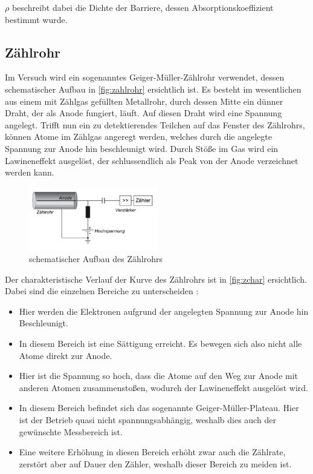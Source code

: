 \documentclass[12pt,english,ngerman]{scrartcl}
\begin{document}
$\rho$ beschreibt dabei die Dichte der Barriere, dessen Absorptionskoeffizient bestimmt wurde.\cite[]{}


\subsection{Zählrohr}

Im Versuch wird ein sogenanntes Geiger-Müller-Zählrohr verwendet, dessen schematischer Aufbau in \autoref{fig:zahlrohr} ersichtlich ist.
Es besteht im wesentlichen aus einem mit Zählgas gefüllten Metallrohr, durch dessen Mitte ein dünner Draht, der als Anode fungiert,
läuft. Auf diesen Draht wird eine Spannung angelegt. Trifft nun ein zu detektierendes Teilchen auf das Fenster des 
Zählrohrs, können Atome im Zählgas angeregt werden, welches durch die angelegte Spannung zur Anode hin beschleunigt 
wird. Durch Stöße im Gas wird ein Lawineneffekt ausgelöst, der schlussendlich als Peak von der Anode verzeichnet werden kann.

\begin{figure}[H]
  \begin{center}
  \includegraphics[width=0.5\textwidth]{./figures/zahlrohr.png}
	\end{center}
	\caption{schematischer Aufbau des Zählrohrs \cite[]{}}
	\label{fig:zahlrohr}
    
\end{figure}

Der charakteristische Verlauf der Kurve des Zählrohrs ist in \autoref{fig:zchar} ersichtlich.
Dabei sind die einzelnen Bereiche zu unterscheiden \cite[]{} :

\begin{itemize}
  \item Hier werden die Elektronen aufgrund der angelegten Spannung zur Anode hin Beschleunigt.
  \item In diesem Bereich ist eine Sättigung erreicht. Es bewegen sich also nicht alle Atome direkt zur Anode.
  \item Hier ist die Spannung so hoch, dass die Atome auf den Weg zur Anode mit anderen Atomen zusammenstoßen, wodurch der Lawineneffekt ausgelöst wird.
  \item In diesem Bereich befindet sich das sogenannte Geiger-Müller-Plateau. Hier ist der Betrieb quasi nicht spannungsabhängig, weshalb dies auch der gewünschte Messbereich ist.
  \item Eine weitere Erhöhung in diesen Bereich erhöht zwar auch die Zählrate, zerstört aber auf Dauer den Zähler, weshalb dieser Bereich zu meiden ist.
\end{itemize}
\end{document}

